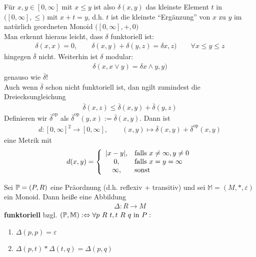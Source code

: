 \begin{bemerkung}
Für $x,y\in[0,\infty]$ mit $x\leq y$ ist also $\delta(x,y)$ das kleinste Element $t$ in $\big([0,\infty],\leq\big)$ mit $x+t=y$, d.h. $t$ ist die kleinste ``Ergänzung'' von $x$ zu $y$ im natürlich geordneten Monoid $\big([0,\infty],+,0\big)$\\
Man erkennt hieraus leicht, dass $\delta$ funktoriell ist:
\begin{align*}
\delta(x,x)=0,\qquad\delta(x,y)+\delta(y,z)=\delta x,z)\qquad\forall x\leq y\leq z
\end{align*}
hingegen $\overline{\delta}$ nicht. Weiterhin ist $\delta$ modular:
\begin{align*}
\delta(x,x\vee y)=\delta x\wedge y,y)
\end{align*}
genauso wie $\overline{\delta}$!\\
Auch wenn $\overline{\delta}$ schon nicht funktoriell ist, dan ngilt zumindest die Dreiecksungleichung
\begin{align*}
\overline{\delta}(x,z)\leq\overline{\delta}(x,y)+\overline{\delta}(y,z)
\end{align*}
Definieren wir $\overline{\delta}^{\text{op}}$ als $\overline{\delta}^{\text{op}}(y,x):=\overline{\delta}(x,y)$. Dann ist
\begin{align*}
d:[0,\infty]^2\to[0,\infty],\qquad (x,y)\mapsto\overline{\delta}(x,y)+\overline{\delta}^{\text{op}}(x,y)
\end{align*}
eine Metrik mit
\begin{align*}
d(x,y)=\left\lbrace\begin{array}{cl}
|x-y|, &\falls x\neq\infty,y\neq0\\
0, &\falls x=y=\infty\\
\infty, &\sonst
\end{array}\right.
\end{align*}
\end{bemerkung}

\begin{definition}
Sei $\P=(P,R)$ eine Präordnung (d.h. reflexiv + transitiv) und sei $\mathbb{M}=(M,\ast,\varepsilon)$ ein Monoid. Dann heiße eine Abbildung
\begin{align*}
\Delta:R\to M
\end{align*}
\textbf{funktoriell} bzgl. $(\P,\mathbb{M}):\gdw\forall p~R~t,t~R~q\text{ in }P:$
\begin{enumerate}
\item $\Delta(p,p)=\varepsilon$
\item $\Delta(p,t)\ast\Delta(t,q)=\Delta(p,q)$
\end{enumerate}
\end{definition}
 
